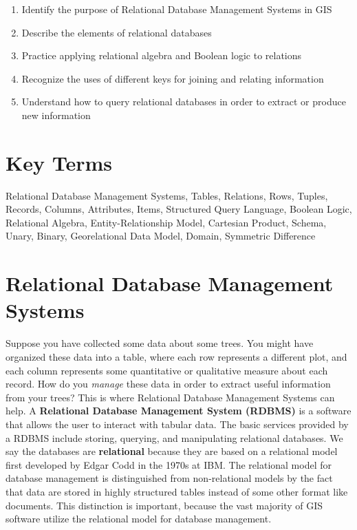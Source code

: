 \documentclass[
]{book}
\providecommand{\tightlist}{%
  \setlength{\itemsep}{0pt}\setlength{\parskip}{0pt}}
\begin{document}
\begin{enumerate}
\def\labelenumi{\arabic{enumi}.}
\tightlist
\item
  Identify the purpose of Relational Database Management Systems in GIS
\item
  Describe the elements of relational databases
\item
  Practice applying relational algebra and Boolean logic to relations
\item
  Recognize the uses of different keys for joining and relating information
\item
  Understand how to query relational databases in order to extract or produce new information
\end{enumerate}

\hypertarget{key-terms-4}{%
\section*{Key Terms}\label{key-terms-4}}

Relational Database Management Systems, Tables, Relations, Rows, Tuples, Records, Columns, Attributes, Items, Structured Query Language, Boolean Logic, Relational Algebra, Entity-Relationship Model, Cartesian Product, Schema, Unary, Binary, Georelational Data Model, Domain, Symmetric Difference

\hypertarget{relational-database-management-systems}{%
\section{Relational Database Management Systems}\label{relational-database-management-systems}}

Suppose you have collected some data about some trees. You might have organized these data into a table, where each row represents a different plot, and each column represents some quantitative or qualitative measure about each record. How do you \emph{manage} these data in order to extract useful information from your trees? This is where Relational Database Management Systems can help. A \textbf{Relational Database Management System (RDBMS)} is a software that allows the user to interact with tabular data. The basic services provided by a RDBMS include storing, querying, and manipulating relational databases. We say the databases are \textbf{relational} because they are based on a relational model first developed by Edgar Codd in the 1970s at IBM. The relational model for database management is distinguished from non-relational models by the fact that data are stored in highly structured tables instead of some other format like documents. This distinction is important, because the vast majority of GIS software utilize the relational model for database management.
\end{document}
